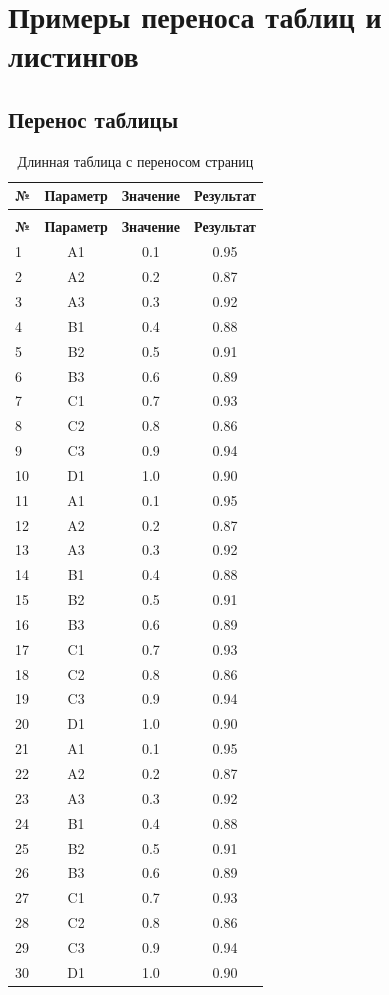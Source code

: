 
\section{Примеры переноса таблиц и листингов}

\subsection{Перенос таблицы}

\begin{longtable}{|l|c|c|c|}
\caption{Длинная таблица с переносом страниц} \label{tab:long_table} \\
\hline
\textbf{№} & \textbf{Параметр} & \textbf{Значение} & \textbf{Результат} \\
\hline
\endfirsthead

\tablecontinuation{\thetable} \\
\hline
\textbf{№} & \textbf{Параметр} & \textbf{Значение} & \textbf{Результат} \\
\hline
\endhead

\hline
\endfoot

\hline
\endlastfoot

1 & A1 & 0.1 & 0.95 \\
2 & A2 & 0.2 & 0.87 \\
3 & A3 & 0.3 & 0.92 \\
4 & B1 & 0.4 & 0.88 \\
5 & B2 & 0.5 & 0.91 \\
6 & B3 & 0.6 & 0.89 \\
7 & C1 & 0.7 & 0.93 \\
8 & C2 & 0.8 & 0.86 \\
9 & C3 & 0.9 & 0.94 \\
10 & D1 & 1.0 & 0.90 \\
11 & A1 & 0.1 & 0.95 \\
12 & A2 & 0.2 & 0.87 \\
13 & A3 & 0.3 & 0.92 \\
14 & B1 & 0.4 & 0.88 \\
15 & B2 & 0.5 & 0.91 \\
16 & B3 & 0.6 & 0.89 \\
17 & C1 & 0.7 & 0.93 \\
18 & C2 & 0.8 & 0.86 \\
19 & C3 & 0.9 & 0.94 \\
20 & D1 & 1.0 & 0.90 \\
21 & A1 & 0.1 & 0.95 \\
22 & A2 & 0.2 & 0.87 \\
23 & A3 & 0.3 & 0.92 \\
24 & B1 & 0.4 & 0.88 \\
25 & B2 & 0.5 & 0.91 \\
26 & B3 & 0.6 & 0.89 \\
27 & C1 & 0.7 & 0.93 \\
28 & C2 & 0.8 & 0.86 \\
29 & C3 & 0.9 & 0.94 \\
30 & D1 & 1.0 & 0.90 \\

\end{longtable}

